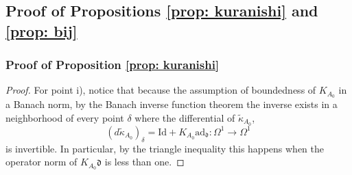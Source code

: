 \documentclass[11pt,a4paper]{amsart}
\theoremstyle{plain} %
\theoremstyle{definition}
\theoremstyle{remark}
\newcommand{\til}{\widetilde}
\newcommand{\ddd}{\mathfrak{d}}
\begin{document}
\subsection{Proof of Propositions \ref{prop: kuranishi} and \ref{prop: bij}}
\subsubsection{Proof of Proposition \ref{prop: kuranishi}}\label{app: proofs 1}
\begin{proof}%
      For point i), notice that because the assumption of boundedness of $K_{A_0}$ in a Banach norm, by the Banach inverse function theorem the inverse exists in a neighborhood of every point $\delta$ where the differential of $\til{\kappa}_{A_0}$, 
\begin{equation}
    (d \til\kappa_{A_0})_\delta = \mathrm{Id} + K_{A_0}\mathrm{ad}_\ddd \colon \Omega^1 \to \Omega^1
\end{equation}
is invertible. In particular, by the triangle inequality this happens when the operator norm of $K_{A_0}\ddd$ is less than one. 


\end{proof}
\end{document}
